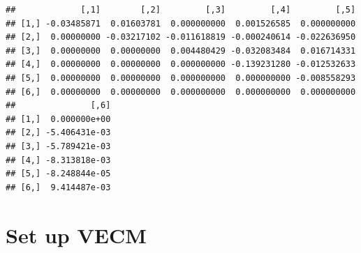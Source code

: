 \documentclass[11pt,preprint, authoryear]{elsarticle}
\numberwithin{equation}{section}
\numberwithin{figure}{section}
\numberwithin{table}{section}
\begin{document}
\begin{verbatim}
##             [,1]        [,2]         [,3]         [,4]         [,5]
## [1,] -0.03485871  0.01603781  0.000000000  0.001526585  0.000000000
## [2,]  0.00000000 -0.03217102 -0.011618819 -0.000240614 -0.022636950
## [3,]  0.00000000  0.00000000  0.004480429 -0.032083484  0.016714331
## [4,]  0.00000000  0.00000000  0.000000000 -0.139231280 -0.012532633
## [5,]  0.00000000  0.00000000  0.000000000  0.000000000 -0.008558293
## [6,]  0.00000000  0.00000000  0.000000000  0.000000000  0.000000000
##               [,6]
## [1,]  0.000000e+00
## [2,] -5.406431e-03
## [3,] -5.789421e-03
## [4,] -8.313818e-03
## [5,] -8.248844e-05
## [6,]  9.414487e-03
\end{verbatim}

\hypertarget{set-up-vecm}{%
\section{Set up VECM}\label{set-up-vecm}}
\end{document}
